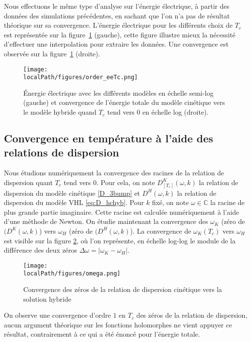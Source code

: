 Nous effectuons le même type d'analyse sur l'énergie électrique, à partir des données des simulations précédentes, en sachant que l'on n'a pas de résultat théorique sur sa convergence. L'énergie électrique pour les différents choix de $T_c$ est représentée sur la figure~\ref{fig:limit:ee} (gauche), cette figure illustre mieux la nécessité d'effectuer une interpolation pour extraire les données. Une convergence est observée sur la figure~\ref{fig:limit:ee} (droite).
\begin{figure}[h]
  \centering
  \texttt{[image: \\localPath/figures/order\_eeTc.png]}
  \caption{Énergie électrique avec les différents modèles en échelle semi-log (gauche) et convergence de l'énergie totale du modèle cinétique vers le modèle hybride quand $T_c$ tend vers $0$ en échelle log (droite).}
  \label{fig:limit:ee}
\end{figure}

\FloatBarrier

\subsection{Convergence en température à l'aide des relations de dispersion}

Nous étudions numériquement la convergence des racines de la relation de dispersion quant $T_c$ tend vers $0$. Pour cela, on note $D^K_{[T_c]}(\omega,k)$ la relation de dispersion du modèle cinétique \eqref{D_3bump} et $D^H(\omega,k)$ la relation de dispersion du modèle VHL \eqref{eq:D_hchyb}. Pour $k$ fixé, on note $\omega\in\mathbb{C}$ la racine de plus grande partie imaginaire. 
Cette racine est calculée numériquement à l'aide d'une méthode de Newton. On étudie maintenant la convergence des $\omega_K$ (zéro de $(D^K(\omega,k)$) vers $\omega_H$ (zéro de $(D^H(\omega,k)$). La convergence de $\omega_K(T_c)$ vers $\omega_H$ est visible sur la figure \ref{fig:omega}, où l'on représente, en échelle log-log le module de la différence des deux zéros $\Delta \omega = |\omega_K-\omega_H|$.
\begin{figure}[h!]
  \centering
  \texttt{[image: \\localPath/figures/omega.png]}
  \caption{Convergence des zéros de la relation de dispersion cinétique vers la solution hybride}
  \label{fig:omega}
\end{figure}
On observe une convergence d'ordre $1$ en $T_c$ des zéros de la relation de dispersion, aucun argument théorique sur les fonctions holomorphes ne vient appuyer ce résultat, contrairement à ce qui a été énoncé pour l'énergie totale.

